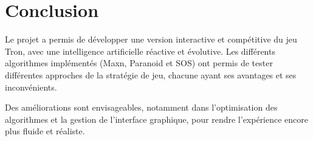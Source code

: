 \documentclass[a4paper,12pt]{article}
\begin{document}
\newpage

\section{Conclusion}
Le projet a permis de développer une version interactive et compétitive du jeu Tron, avec une intelligence artificielle réactive et évolutive. Les différents algorithmes implémentés (Maxn, Paranoid et SOS) ont permis de tester différentes approches de la stratégie de jeu, chacune ayant ses avantages et ses inconvénients.

Des améliorations sont envisageables, notamment dans l’optimisation des algorithmes et la gestion de l’interface graphique, pour rendre l’expérience encore plus fluide et réaliste.
\end{document}
